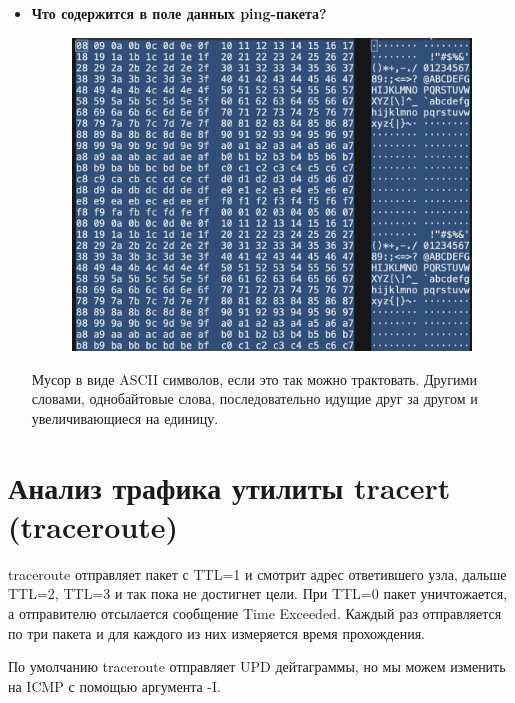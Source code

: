\documentclass[12pt,onecolumn]{article}
\begin{document}
\begin{itemize}
{    }
    \item {
        \textbf{Что содержится в поле данных ping-пакета?}
        \begin{figure}[H]
            \centering
            \includegraphics*[width=\textwidth]{image/part1/ping-data.png}
        \end{figure}
        Мусор в виде ASCII символов, если это так можно трактовать. Другими
        словами, однобайтовые слова, последовательно идущие друг за другом и
        увеличивающиеся на единицу.
    }
\end{itemize}
\section{Анализ трафика утилиты tracert (traceroute)}
traceroute отправляет пакет с TTL=1 и смотрит адрес ответившего узла, дальше TTL=2, TTL=3 и так пока не достигнет цели. 
При TTL=0 пакет уничтожается, а отправителю отсылается сообщение Time Exceeded.
Каждый раз отправляется по три пакета и для каждого из них измеряется время прохождения.

По умолчанию traceroute отправляет UPD дейтаграммы, но мы можем изменить на ICMP с помощью аргумента -I. 
\end{document}

